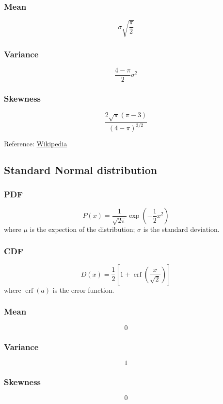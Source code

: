 \subsubsection*{Mean}
\[
    \sigma \sqrt{\frac{\pi}{2}}
\]

\subsubsection*{Variance}
\[
    {\frac {4-\pi }{2}}\sigma ^{2}
\]

\subsubsection*{Skewness}
\[
    {\frac {2{\sqrt {\pi }}(\pi -3)}{(4-\pi )^{3/2}}}
\]

Reference:
\href{https://en.wikipedia.org/wiki/Rayleigh_distribution}{Wikipedia}

\subsection{Standard Normal distribution}

\subsubsection*{PDF}
\[
    P(x) = \frac{1}{\sqrt {2\pi }}
        \exp{(-{\frac {1}{2}} x^{2})}
\]
where $\mu$ is the expection of the distribution; 
$\sigma$ is the standard deviation.

\subsubsection*{CDF}
\[
    D(x) = {\frac{1}{2}} \left[1+\operatorname {erf} 
        \left( {\frac{x}{{\sqrt {2}}}} \right) \right]
\]
where $\operatorname {erf}(a)$ is the error function.

\subsubsection*{Mean}
\[
    0
\]

\subsubsection*{Variance}
\[
    1
\]

\subsubsection*{Skewness}
\[
    0
\]

